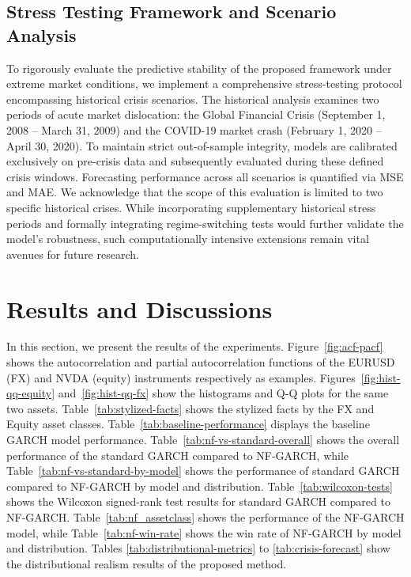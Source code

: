 \documentclass[risks,article,submit,pdftex,moreauthors]{Definitions/mdpi}
\begin{document}
\subsection{Stress Testing Framework and Scenario Analysis}
To rigorously evaluate the predictive stability of the proposed framework under extreme market conditions, we implement a comprehensive stress-testing protocol encompassing  historical crisis scenarios. The historical analysis examines two periods of acute market dislocation: the Global Financial Crisis (September 1, 2008 – March 31, 2009) and the COVID-19 market crash (February 1, 2020 – April 30, 2020). To maintain strict out-of-sample integrity, models are calibrated exclusively on pre-crisis data and subsequently evaluated during these defined crisis windows. Forecasting performance across all scenarios is quantified via MSE and MAE. We acknowledge that the scope of this evaluation is limited to two specific historical crises. While incorporating supplementary historical stress periods and formally integrating regime-switching tests would further validate the model's robustness, such computationally intensive extensions remain vital avenues for future research.

\section{Results and Discussions}
\label{sec:results}

In this section, we present the results of the experiments. Figure~\ref{fig:acf-pacf} shows the autocorrelation and partial autocorrelation functions of the EURUSD (FX) and NVDA (equity) instruments respectively as examples. Figures~\ref{fig:hist-qq-equity} and~\ref{fig:hist-qq-fx} show the histograms and Q-Q plots for the same two assets. Table~\ref{tab:stylized-facts} shows the stylized facts by the FX and Equity asset classes. Table~\ref{tab:baseline-performance} displays the baseline GARCH model performance. Table~\ref{tab:nf-vs-standard-overall} shows the overall performance of the standard GARCH compared to NF-GARCH, while Table~\ref{tab:nf-vs-standard-by-model} shows the performance of standard GARCH compared to NF-GARCH by model and distribution. Table~\ref{tab:wilcoxon-tests} shows the Wilcoxon signed-rank test results for standard GARCH compared to NF-GARCH. Table~\ref{tab:nf_assetclass} shows the performance of the NF-GARCH model, while Table~\ref{tab:nf-win-rate} shows the win rate of NF-GARCH by model and distribution. Tables \ref{tab:distributional-metrics} to \ref{tab:crisis-forecast} show the distributional realism results of the proposed method.
\end{document}
